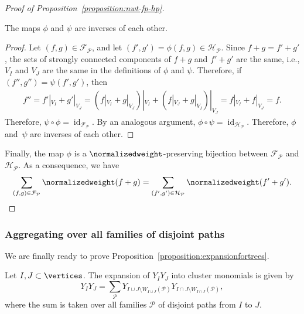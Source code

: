 \begin{proof}[Proof of Proposition~\ref{proposition:nwt-fp-hp}]
\begin{claim}
    The maps \(\phi\) and \(\psi\) are inverses of each other.
\end{claim}
\begin{proof}
    Let \((f, g) \in \mathcal{F}_{\mathcal{P}}\), and let \((f', g') = \phi(f, g) \in \mathcal{H}_{\mathcal{P}}\).
    Since \(f+g = f'+g'\), the sets of strongly connected components of \(f+g\) and \(f'+g'\) are the same, i.e., \(V_I\) and \(V_J\) are the same in the definitions of \(\phi\) and \(\psi\).
    Therefore, if \((f'', g'') = \psi(f', g')\),
    then
    \begin{align*}
        f'' = f'|_{V_I} + g'|_{V_J} = (f|_{V_I} + g|_{V_J})|_{V_I} + (f|_{V_J} + g|_{V_I})|_{V_J} = f|_{V_I} + f|_{V_J} = f.
    \end{align*}
    Therefore, \(\psi \circ \phi = \operatorname{id}_{\mathcal{F}_{\mathcal{P}}}\).
    By an analogous argument, \(\phi \circ \psi = \operatorname{id}_{\mathcal{H}_{\mathcal{P}}}\).
    Therefore, \(\phi\) and~\(\psi\) are inverses of each other.
\end{proof}

Finally, the map \(\phi\) is a \(\normalizedweight\)-preserving bijection between \(\mathcal{F}_{\mathcal{P}}\) and \(\mathcal{H}_{\mathcal{P}}\).
As a consequence, we have
\begin{equation*} \label{eq:sum-Fp-equals-sum-Hp}
    \sum_{(f,g) \in \mathcal{F}_{\mathcal{P}}} \normalizedweight(f+g) = \sum_{(f',g') \in \mathcal{H}_{\mathcal{P}}} \normalizedweight(f'+g'). \qedhere
\end{equation*}
\end{proof}

\subsubsection{Aggregating over all families of disjoint paths}

We are finally ready to prove Proposition~\ref{proposition:expansionfortrees}.

\begin{prop*}
    Let \(I, J \subset \vertices\).
    The expansion of \(Y_IY_J\) into cluster monomials is given by
    \begin{equation*}
        Y_IY_J = \sum_{\mathcal{P}} Y_{I \cup J \setminus W_{I \cup J}(\mathcal{P})}Y_{I \cap J \setminus W_{I \cap J}(\mathcal{P})},
    \end{equation*} 
    where the sum is taken over all families \(\mathcal{P}\) of disjoint paths from \(I\) to \(J\).
\end{prop*}

